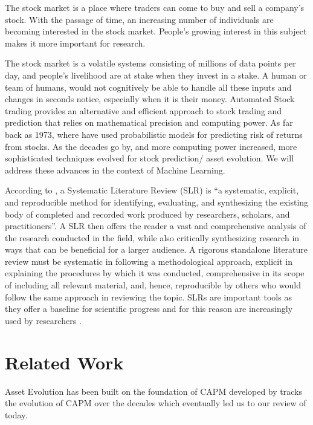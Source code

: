 \documentclass[11pt]{article}
\begin{document}
The stock market is a place where traders can come to buy and sell a company's stock. With the passage of time, an increasing number of individuals are becoming interested in the stock market. People's growing interest in this subject makes it more important for research. 

The stock market is a volatile systems consisting of millions of data points per day, and people's livelihood are at stake when they invest in a stake. A human or team of humans, would not cognitively be able to handle all these inputs and changes in seconds notice, especially when it is their money. Automated Stock trading provides an alternative and efficient approach to stock trading and prediction that relies on mathematical precision and computing power. As far back as 1973, where \cite{rosenberg1973} have used probabilistic models for predicting risk of returns from stocks. As the decades go by, and more computing power increased, more sophisticated techniques evolved for stock prediction/ asset evolution. We will address these advances in the context of Machine Learning.

According to \citet{okoli2015guide}, a Systematic Literature Review (SLR) is “a systematic, explicit, and reproducible method for identifying, evaluating, and synthesizing the existing body of completed and recorded work produced by researchers, scholars, and practitioners”. A SLR then offers the reader a vast and comprehensive analysis of the research conducted in the field, while also critically synthesizing research in ways that can be beneficial for a larger audience. A rigorous standalone literature review must be systematic in following a methodological approach, explicit in explaining the procedures by which it was
conducted, comprehensive in its scope of including all relevant material, and, hence, reproducible by others who would follow the same approach in reviewing the topic. SLRs are important tools as they offer a baseline for scientific progress and for this reason are increasingly used by researchers \citet[]{ozbayoglu2020survey}.

\section{Related Work}
 Asset Evolution has been built on the foundation of CAPM developed by \cite{shih2014evolution} tracks the evolution of CAPM over the decades which eventually led us to our review of today.

\label{S:RelatedWorks}
\end{document}
